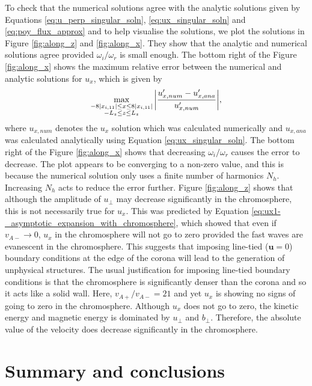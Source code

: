 \documentclass[linenumbers]{aastex63}
\let\vec\boldsymbol
\begin{document}
To check that the numerical solutions agree with the analytic solutions given by Equations \eqref{eq:u_perp_singular_soln}, \eqref{eq:ux_singular_soln} and \eqref{eq:poy_flux_approx} and to help visualise the solutions, we plot the solutions in Figure \ref{fig:along_z} and \ref{fig:along_x}. They show that the analytic and numerical solutions agree provided $\omega_i/\omega_r$ is small enough. The bottom right of the Figure \ref{fig:along_x} shows the maximum relative error between the numerical and analytic solutions for $u_x$, which is given by
\[
\max_{\substack{-8|x_{i,11}|\le x\le 8|x_{i,11}| \\ -L_z\le z \le L_z}}\abs{\frac{u_{x,num}'-u_{x,ana}'}{u_{x,num}'}},
\]
where $u_{x,num}$ denotes the $u_x$ solution which was calculated numerically and $u_{x,ana}$ was calculated analytically using Equation \eqref{eq:ux_singular_soln}. The bottom right of the Figure \ref{fig:along_x} shows that decreasing $\omega_i/\omega_r$ causes the error to decrease. The plot appears to be converging to a non-zero value, and this is because the numerical solution only uses a finite number of harmonics $N_h$. Increasing $N_h$ acts to reduce the error further. Figure \ref{fig:along_z} shows that although the amplitude of $u_\perp$ may decrease significantly in the chromosphere, this is not necessarily true for $u_x$. This was predicted by Equation \eqref{eq:ux1-_asymptotic_expansion_with_chromosphere}, which showed that even if $v_{A-}\rightarrow0$, $u_x$ in the chromosphere will not go to zero provided the fast waves are evanescent in the chromosphere. This suggests that imposing line-tied ($\vec{u}=0$) boundary conditions at the edge of the corona will lead to the generation of unphysical structures. The usual justification for imposing line-tied boundary conditions is that the chromosphere is significantly denser than the corona and so it acts like a solid wall. Here, $v_{A+}/v_{A-}=21$ and yet $u_x$ is showing no signs of going to zero in the chromosphere. Although $u_x$ does not go to zero, the kinetic energy and magnetic energy is dominated by $u_\perp$ and $b_\perp$. Therefore, the absolute value of the velocity does decrease significantly in the chromosphere.

\section{Summary and conclusions}
\label{sec:summary}
\end{document}
